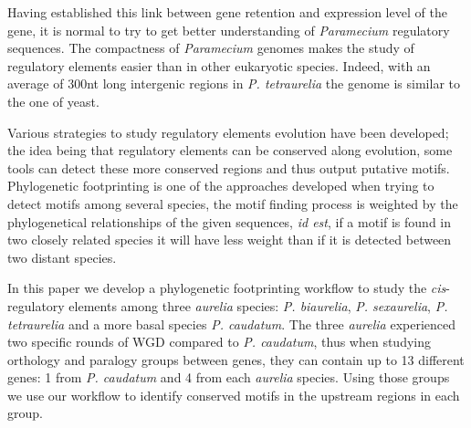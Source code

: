 Having established this link between gene retention and expression level of the gene, it is normal to try to get better understanding of \textit{Paramecium} regulatory sequences. The compactness of \textit{Paramecium} genomes makes the study of regulatory elements easier than in other eukaryotic species. Indeed, with an average of 300nt long intergenic regions in \textit{P. tetraurelia} the genome is similar to the one of yeast.

Various strategies to study regulatory elements evolution have been developed; the idea being that regulatory elements can be conserved along evolution, some tools can detect these more conserved regions and thus output putative motifs. Phylogenetic footprinting is one of the approaches developed when trying to detect motifs among several species, the motif finding process is weighted by the phylogenetical relationships of the given sequences, \textit{id est}, if a motif is found in two closely related species it will have less weight than if it is detected between two distant species.

In this paper we develop a phylogenetic footprinting workflow to study the \textit{cis}-regulatory elements among three \textit{aurelia} species: \textit{P. biaurelia}, \textit{P. sexaurelia}, \textit{P. tetraurelia} and a more basal species \textit{P. caudatum}. The three \textit{aurelia} experienced two specific rounds of WGD compared to \textit{P. caudatum}, thus when studying orthology and paralogy groups between genes, they can contain up to 13 different genes: 1 from \textit{P. caudatum} and 4 from each \textit{aurelia} species. Using those groups we use our workflow to identify conserved motifs in the upstream regions in each group.

